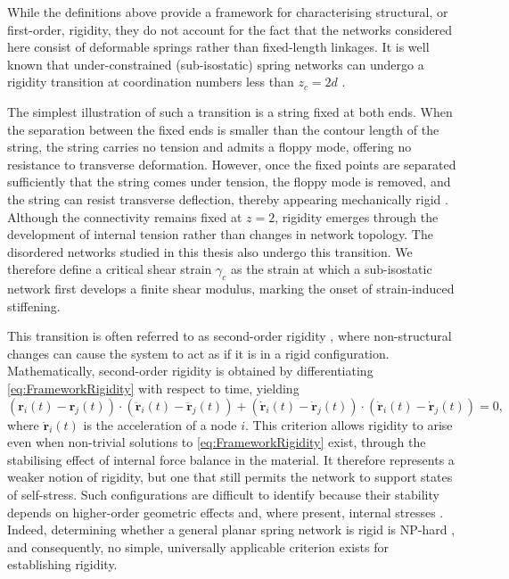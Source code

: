 While the definitions above provide a framework for characterising structural, or first-order, rigidity, they do not account for the fact that the networks considered here consist of deformable springs rather than fixed-length linkages. It is well known that under-constrained (sub-isostatic) spring networks can undergo a rigidity transition at coordination numbers less than $z_c=2d$ \cite{feng_percolation_1984, sharma_strain-controlled_2016, wyart_elasticity_2008, feng_nonlinear_2016, vermeulen_geometry_2017, rens_micromechanical_2018}.

The simplest illustration of such a transition is a string fixed at both ends. When the separation between the fixed ends is smaller than the contour length of the string, the string carries no tension and admits a floppy mode, offering no resistance to transverse deformation. However, once the fixed points are separated sufficiently that the string comes under tension, the floppy mode is removed, and the string can resist transverse deflection, thereby appearing mechanically rigid \cite{biot_mechanics_1965}. Although the connectivity remains fixed at $z = 2$, rigidity emerges through the development of internal tension rather than changes in network topology. The disordered networks studied in this thesis also undergo this transition. We therefore define a critical shear strain $\gamma_c$ as the strain at which a sub-isostatic network first develops a finite shear modulus, marking the onset of strain-induced stiffening.

This transition is often referred to as second-order rigidity \cite{connelly_second-order_1996}, where non-structural changes can cause the system to act as if it is in a rigid configuration. Mathematically, second-order rigidity is obtained by differentiating \cref{eq:FrameworkRigidity} with respect to time, yielding
\begin{equation*}
(\bm{r}_i(t) - \bm{r}_j(t))\cdot(\bm{\ddot{r}}_i(t) - \bm{\ddot{r}}_j(t)) + (\bm{\dot{r}}_i(t) - \bm{\dot{r}}_j(t))\cdot(\bm{\dot{r}}_i(t) - \bm{\dot{r}}_j(t)) = 0,
\end{equation*}
where $\ddot{\bm{r}}_i(t)$ is the acceleration of a node $i$. This criterion allows rigidity to arise even when non-trivial solutions to \cref{eq:FrameworkRigidity} exist, through the stabilising effect of internal force balance in the material. It therefore represents a weaker notion of rigidity, but one that still permits the network to support states of self-stress. Such configurations are difficult to identify because their stability depends on higher-order geometric effects and, where present, internal stresses \cite{holmes-cerfon_almost-rigidity_2021,connelly_frameworks_2022,connelly_second-order_1996,calladine_first-order_1991}. Indeed, determining whether a general planar spring network is rigid is NP-hard \cite{abbott_generalizations_2008}, and consequently, no simple, universally applicable criterion exists for establishing rigidity.


